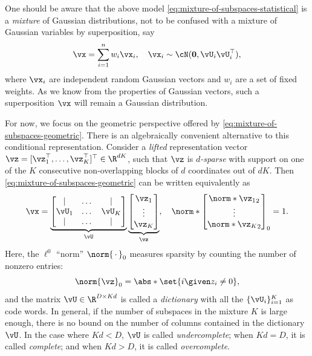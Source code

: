 \documentclass[../../book-main.tex]{subfiles}
\begin{document}
\begin{remark}
    One should be aware that the above model
    \eqref{eq:mixture-of-subspaces-statistical} is a \textit{mixture} of
    Gaussian distributions, not to be confused with a mixture of Gaussian
    variables by superposition, say
    \begin{equation}
        \vx = \sum_{i=1}^n w_i \vx_i, \quad \vx_i \sim
        \cN(\mathbf{0}, \vU_i\vU_i^\top),
    \end{equation}
    where $\vx_i$ are independent random Gaussian vectors and $w_i$
    are a set of fixed weights. As we know from the properties of
    Gaussian vectors, such a superposition $\vx$ will remain a
    Gaussian distribution.
\end{remark}

For now, we focus on the geometric perspective offered by
\eqref{eq:mixture-of-subspaces-geometric}.
There is an algebraically convenient alternative to this conditional
representation. Consider a \textit{lifted} representation vector $\vz
= [\vz_1^\top, \dots, \vz_K^\top]^\top \in \R^{dK}$, such that $\vz$
is \textit{$d$-sparse} with support on one of the $K$ consecutive
non-overlapping blocks of $d$ coordinates out of $dK$.
Then \eqref{eq:mixture-of-subspaces-geometric} can be written equivalently as
\begin{equation}\label{eq:mixture-of-subspaces-dictionary-pre}
    \vx =
    \underbrace{
        \begin{bmatrix}
            | & \dots & |  \\
            \vU_1 & \dots & \vU_K  \\
            | & \dots & |
        \end{bmatrix}
    }_{\vU}
    \underbrace{
        \begin{bmatrix} \vz_1 \\ \vdots \\ \vz_K
        \end{bmatrix}
    }_{\vz},
    \quad
    \norm*{
        \begin{bmatrix} \norm*{\vz_1}_2 \\ \vdots \\ \norm*{\vz_K}_2
        \end{bmatrix}
    }_0 = 1.
\end{equation}
Here, the $\ell^0$ ``norm'' $\norm{\,\cdot\,}_0$ measures sparsity by
counting the number of nonzero entries:
\begin{equation}\label{eq:ell-zero-norm}
    \norm{\vz}_0 = \abs*{\set{i \given z_i \neq 0}},
\end{equation}
and the matrix $\vU \in \R^{D \times Kd}$ is called a
\textit{dictionary} with all the $\{\vU_i\}_{i=1}^K$ as code words.
In general, if the number of subspaces in the mixture $K$ is large
enough, there is no bound on the number of columns contained in the
dictionary $\vU$. In the case where $Kd < D$, $\vU$ is called
\textit{undercomplete};
when $Kd = D$, it is called \textit{complete}; and when $Kd > D$, it
is called \textit{overcomplete}.
\end{document}
